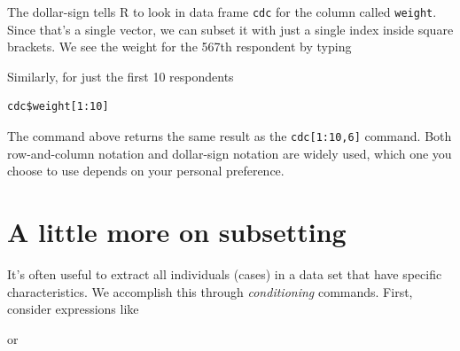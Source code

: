 \documentclass[]{book}
\newenvironment{Shaded}{\begin{snugshade}}{\end{snugshade}}
\newcommand{\DecValTok}[1]{\textcolor[rgb]{0.00,0.00,0.81}{#1}}
\newcommand{\NormalTok}[1]{#1}
\newcommand{\OperatorTok}[1]{\textcolor[rgb]{0.81,0.36,0.00}{\textbf{#1}}}
\newcommand{\StringTok}[1]{\textcolor[rgb]{0.31,0.60,0.02}{#1}}
\theoremstyle{definition}
\theoremstyle{definition}
\theoremstyle{definition}
\theoremstyle{remark}
\begin{document}
\begin{Shaded}
\end{Shaded}

The dollar-sign tells R to look in data frame \texttt{cdc} for the
column called \texttt{weight}. Since that's a single vector, we can
subset it with just a single index inside square brackets. We see the
weight for the 567th respondent by typing

\begin{Shaded}
\end{Shaded}

Similarly, for just the first 10 respondents

\begin{verbatim}
cdc$weight[1:10]
\end{verbatim}

The command above returns the same result as the
\texttt{cdc{[}1:10,6{]}} command. Both row-and-column notation and
dollar-sign notation are widely used, which one you choose to use
depends on your personal preference.

\hypertarget{a-little-more-on-subsetting}{%
\section{A little more on
subsetting}\label{a-little-more-on-subsetting}}

It's often useful to extract all individuals (cases) in a data set that
have specific characteristics. We accomplish this through
\emph{conditioning} commands. First, consider expressions like

\begin{Shaded}
\end{Shaded}

or

\begin{Shaded}
\end{Shaded}
\end{document}

